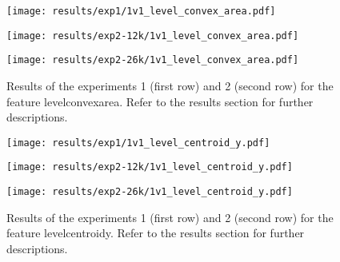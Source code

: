  
\begin{figure}[h!]
    \centering
	\begin{minipage}{0.3\linewidth}
		\texttt{[image: results/exp1/1v1\_level\_convex\_area.pdf]}
	\end{minipage}

	\begin{minipage}{0.3\linewidth}
		\texttt{[image: results/exp2-12k/1v1\_level\_convex\_area.pdf]}
	\end{minipage}
	\begin{minipage}{0.3\linewidth}
		\texttt{[image: results/exp2-26k/1v1\_level\_convex\_area.pdf]}
	\end{minipage}

	\caption[ Results: Feature level\textunderscore convex\textunderscore area]{ Results of the experiments 1 (first row) and 2 (second row) for the feature level\textunderscore convex\textunderscore area. Refer to the results section for further descriptions. }
	\label{fig:appendix_level_convex_area}
\end{figure}
 
\begin{figure}[h!]
    \centering
	\begin{minipage}{0.3\linewidth}
		\texttt{[image: results/exp1/1v1\_level\_centroid\_y.pdf]}
	\end{minipage}

	\begin{minipage}{0.3\linewidth}
		\texttt{[image: results/exp2-12k/1v1\_level\_centroid\_y.pdf]}
	\end{minipage}
	\begin{minipage}{0.3\linewidth}
		\texttt{[image: results/exp2-26k/1v1\_level\_centroid\_y.pdf]}
	\end{minipage}

	\caption[ Results: Feature level\textunderscore centroid\textunderscore y]{ Results of the experiments 1 (first row) and 2 (second row) for the feature level\textunderscore centroid\textunderscore y. Refer to the results section for further descriptions. }
	\label{fig:appendix_level_centroid_y}
\end{figure}
 \newpage 

